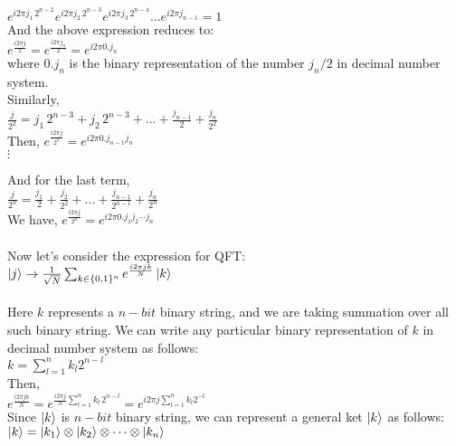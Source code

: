 \documentclass[11.5pt, paper=a4]{article}
\theoremstyle{definition}
\numberwithin{theorem}{section}
\begin{document}
$e^{i2\pi j_1\,2^{n-2}} e^{i2\pi j_2\,2^{n-3}} e^{i2\pi j_3\,2^{n-4}} ... e^{i2\pi j_{n-1}} = 1$\\

And the above expression reduces to:\\
$e^{\frac{i2\pi j}{2}} = e^{\frac{i2\pi j_n}{2}} = e^{i2\pi 0.j_n}$ \\

where $0.j_n$ is the binary representation of the number $j_n/2$ in decimal number system.\\

Similarly,\\
$\frac{j}{2^2} = j_1\,2^{n-3} + j_2\,2^{n-3} + ... + \frac{j_{n-1}}{2}+ \frac{j_n}{2^2}$\\

Then,
$e^{\frac{i2\pi j}{2^2}} = e^{i2\pi 0.j_{n-1} j_n}$\\

$\vdots$

And for the last term,\\
$\frac{j}{2^n} = \frac{j_1}{2} + \frac{j_2}{2^2} + ... + \frac{j_{n-1}}{2^{n-1}} + \frac{j_n}{2^n}$\\

We have,
$e^{\frac{i2\pi j}{2^n}} = e^{i2\pi 0.j_1 j_2 \cdots j_n}$\\\\

Now let's consider the expression for QFT:\\

$\ket{j} \to \frac{1}{\sqrt{N}} \sum_{k \in \{0,1\}^n} e^{\frac{i2\pi jk}{N}} \ket{k}$\\\\

Here $k$ represents a $n-bit$ binary string, and we are taking summation over all such binary string. We can write any particular binary representation of $k$ in decimal number system as follows:\\

$k = \sum_{l=1}^{n} k_l 2^{n-l}$\\

Then,\\

$e^{\frac{i2\pi jk}{N}} = e^{{\frac{i2\pi j}{N}} \sum_{l=1}^{n} k_l\,2^{n-l}} = e^{{i2\pi j} \sum_{l=1}^{n} k_l 2^{-l}}$\\

Since $\ket{k}$ is $n-bit$ binary string, we can represent a general ket $\ket{k}$ as follows:\\
$\ket{k} = \ket{k_1} \otimes \ket{k_2} \otimes \cdots \otimes \ket{k_n}$\\
\end{document}
